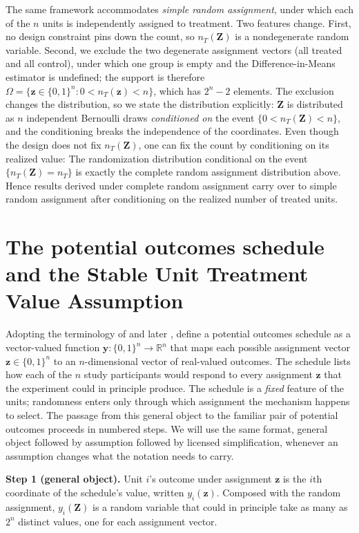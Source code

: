 \documentclass[12pt,leqno]{article}
\theoremstyle{newstyle}
\newcommand{\R}{\mathbb{R}}              %
\newcommand{\bZ}{\bm{Z}}   \newcommand{\bz}{\bm{z}}   %
\newcommand{\po}[2]{y_{#1}(#2)}     %
\begin{document}
The same framework accommodates \textit{simple random assignment}, under which each of the $n$ units is independently assigned to treatment. Two features change. First, no design constraint pins down the count, so $n_T(\bZ)$ is a nondegenerate random variable. Second, we exclude the two degenerate assignment vectors (all treated and all control), under which one group is empty and the Difference-in-Means estimator is undefined; the support is therefore $\Omega = \{\bz \in \{0,1\}^n: 0 < n_T(\bz) < n\}$, which has $2^n - 2$ elements. The exclusion changes the distribution, so we state the distribution explicitly: $\bZ$ is distributed as $n$ independent Bernoulli draws \textit{conditioned on} the event $\{0 < n_T(\bZ) < n\}$, and the conditioning breaks the independence of the coordinates. Even though the design does not fix $n_T(\bZ)$, one can fix the count by conditioning on its realized value: The randomization distribution conditional on the event $\{n_T(\bZ) = n_T\}$ is exactly the complete random assignment distribution above. Hence results derived under complete random assignment carry over to simple random assignment after conditioning on the realized number of treated units.

\section{The potential outcomes schedule and the Stable Unit Treatment Value Assumption}

Adopting the terminology of \citet{freedman2009} and later \citet{gerbergreen2012}, define a potential outcomes schedule as a vector-valued function $\bm{y}: \{0, 1\}^n \to \R^n$ that maps each possible assignment vector $\bz \in \{0, 1\}^n$ to an $n$-dimensional vector of real-valued outcomes. The schedule lists how each of the $n$ study participants would respond to every assignment $\bz$ that the experiment could in principle produce. The schedule is a \textit{fixed} feature of the units; randomness enters only through which assignment the mechanism happens to select. The passage from this general object to the familiar pair of potential outcomes proceeds in numbered steps. We will use the same format, general object followed by assumption followed by licensed simplification, whenever an assumption changes what the notation needs to carry.

\textbf{Step 1 (general object).} Unit $i$'s outcome under assignment $\bz$ is the $i$th coordinate of the schedule's value, written $\po{i}{\bz}$. Composed with the random assignment, $\po{i}{\bZ}$ is a random variable that could in principle take as many as $2^n$ distinct values, one for each assignment vector.
\end{document}
